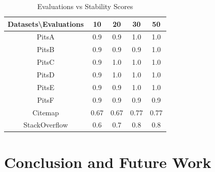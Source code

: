 \documentclass[10pt,conference]{IEEEtran}
\theoremstyle{break}
\begin{document}

\begin{table}[!htbp]
\begin{center}
\begin{tabular}{|c|c|c|c|c|}
\hline 
\textbf{Datasets\textbackslash Evaluations} & \textbf{10} & \textbf{20} & \textbf{30} &
\textbf{50} \\[0.5ex]
\hline
PitsA & 0.9 & 0.9 & 1.0 & 1.0\\ 
\hline
PitsB & 0.9 & 0.9 & 0.9 & 1.0 \\
\hline
PitsC & 0.9 & 1.0 & 1.0 & 1.0\\ 
\hline
PitsD & 0.9 & 1.0 & 1.0 & 1.0\\ 
\hline
PitsE & 0.9 & 0.9 & 1.0 & 1.0\\
\hline
PitsF & 0.9 & 0.9 & 0.9 & 0.9\\
\hline
Citemap & 0.67 & 0.67 & 0.77 & 0.77\\
\hline
StackOverflow & 0.6 & 0.7 & 0.8 & 0.8\\
\hline
\end{tabular}
\end{center}
\caption{Evaluations vs Stability Scores}
\label{tb:tablename1}
\end{table}


\section{Conclusion and Future Work}
\end{document}
